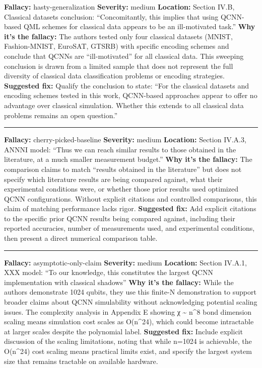\documentclass[10pt,letterpaper]{article}
\begin{document}
\textbf{Fallacy:} hasty-generalization
\textbf{Severity:} medium
\textbf{Location:} Section IV.B, Classical datasets conclusion: ``Concomitantly, this implies that using QCNN-based QML schemes for classical data appears to be an ill-motivated task.''
\textbf{Why it's the fallacy:} The authors tested only four classical datasets (MNIST, Fashion-MNIST, EuroSAT, GTSRB) with specific encoding schemes and conclude that QCNNs are ``ill-motivated'' for all classical data. This sweeping conclusion is drawn from a limited sample that does not represent the full diversity of classical data classification problems or encoding strategies.
\textbf{Suggested fix:} Qualify the conclusion to state: ``For the classical datasets and encoding schemes tested in this work, QCNN-based approaches appear to offer no advantage over classical simulation. Whether this extends to all classical data problems remains an open question.''

\begin{center}\rule{0.5\linewidth}{0.5pt}\end{center}

\textbf{Fallacy:} cherry-picked-baseline
\textbf{Severity:} medium
\textbf{Location:} Section IV.A.3, ANNNI model: ``Thus we can reach similar results to those obtained in the literature, at a much smaller measurement budget.''
\textbf{Why it's the fallacy:} The comparison claims to match ``results obtained in the literature'' but does not specify which literature results are being compared against, what their experimental conditions were, or whether those prior results used optimized QCNN configurations. Without explicit citations and controlled comparisons, this claim of matching performance lacks rigor.
\textbf{Suggested fix:} Add explicit citations to the specific prior QCNN results being compared against, including their reported accuracies, number of measurements used, and experimental conditions, then present a direct numerical comparison table.

\begin{center}\rule{0.5\linewidth}{0.5pt}\end{center}

\textbf{Fallacy:} asymptotic-only-claim
\textbf{Severity:} medium
\textbf{Location:} Section IV.A.1, XXX model: ``To our knowledge, this constitutes the largest QCNN implementation with classical shadows''
\textbf{Why it's the fallacy:} While the authors demonstrate 1024 qubits, they use this finite-N demonstration to support broader claims about QCNN simulability without acknowledging potential scaling issues. The complexity analysis in Appendix E showing χ \textasciitilde{} n\^{}8 bond dimension scaling means simulation cost scales as O(n\^{}24), which could become intractable at larger scales despite the polynomial label.
\textbf{Suggested fix:} Include explicit discussion of the scaling limitations, noting that while n=1024 is achievable, the O(n\^{}24) cost scaling means practical limits exist, and specify the largest system size that remains tractable on available hardware.
\end{document}
